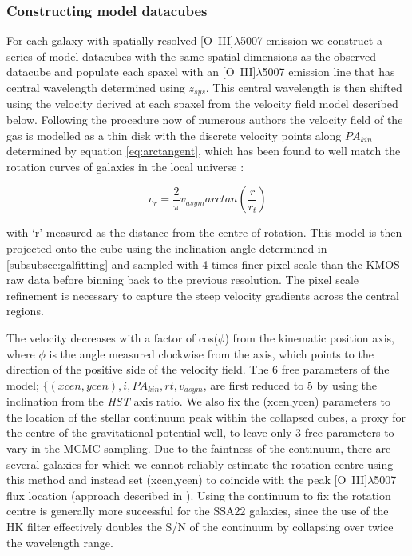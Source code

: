 \documentclass[fleqn,usenatbib]{mn2e}
\begin{document}
\subsubsection{Constructing model datacubes}\label{subsubec:model_cube}
For each galaxy with spatially resolved [O~{\sc III}]$\lambda$5007 emission we construct a series of model datacubes with the same spatial dimensions as the observed datacube and populate each spaxel with an [O~{\sc III}]$\lambda$5007 emission line that has central wavelength determined using $z_{sys}$.
This central wavelength is then shifted using the velocity derived at each spaxel from the velocity field model described below.  
Following the procedure now of numerous authors \citep[e.g.][]{Epinat2010,Epinat2012,Swinbank2012,Stott2016,Mason2016} the velocity field of the gas is modelled as a thin disk with the discrete velocity points along $PA_{kin}$ determined by equation \ref{eq:arctangent}, which has been found to well match the rotation curves of galaxies in the local universe \citep[e.g.][]{Courteau1997}:

\begin{equation}\label{eq:arctangent}
   v_{r} = \frac{2}{\pi}v_{asym}arctan\left(\frac{r}{r_{t}}\right)
\end{equation}

\noindent
with `r' measured as the distance from the centre of rotation.
This model is then projected onto the cube using the inclination angle determined in \cref{subsubsec:galfitting} and sampled with 4 times finer pixel scale than the KMOS raw data before binning back to the previous resolution.
The pixel scale refinement is necessary to capture the steep velocity gradients across the central regions.

The velocity decreases with a factor of cos($\phi$) from the kinematic position axis, where $\phi$ is the angle measured clockwise from the axis, which points to the direction of the positive side of the velocity field.
The 6 free parameters of the model; $\{(xcen, ycen), i, PA_{kin}, rt, v_{asym}$, are first reduced to 5 by using the inclination from the {\em HST} axis ratio.
We also fix the (xcen,ycen) parameters to the location of the stellar continuum peak within the collapsed cubes, a proxy for the centre of the gravitational potential well, to leave only 3 free parameters to vary in the MCMC sampling.
Due to the faintness of the continuum, there are several galaxies for which we cannot reliably estimate the rotation centre using this method and instead set (xcen,ycen) to coincide with the peak [O~{\sc III}]$\lambda$5007 flux location (approach described in \citealt{Harrison2017}).
Using the continuum to fix the rotation centre is generally more successful for the SSA22 galaxies, since the use of the HK filter effectively doubles the S/N of the continuum by collapsing over twice the wavelength range. \\
\end{document}
